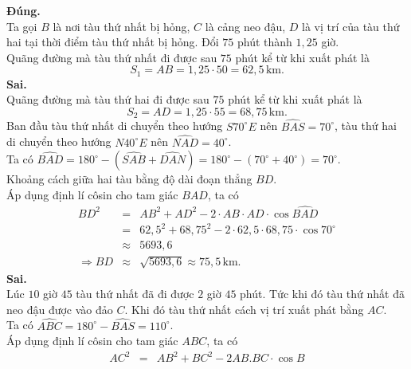 \begin{ex}
{\begin{center}
		\end{center}
\begin{itemchoice}
\itemch \textbf{Đúng.}\\
Ta gọi $B$ là nơi tàu thứ nhất bị hỏng, $C$ là cảng neo đậu, $D$ là vị trí của tàu thứ hai tại thời điểm tàu thứ nhất bị hỏng. Đổi $75$ phút thành $1{,}25$ giờ.\\
Quãng đường mà tàu thứ nhất đi được sau $75$ phút kể từ khi xuất phát là $$S_1=AB=1{,}25\cdot50=62{,}5\,\text{km}.$$
\itemch \textbf{Sai.}\\
Quãng đường mà tàu thứ hai đi được sau $75$ phút kể từ khi xuất phát là $$ S_2=AD=1{,}25\cdot55=68{,}75\,\text{km}.$$
Ban đầu tàu thứ nhất di chuyển theo hướng $S70^\circ E$ nên $\widehat{BAS}=70^\circ$, tàu thứ hai di chuyển theo hướng $N40^\circ E$ nên $\widehat{NAD}=40^\circ$.\\
Ta có $\widehat{BAD}=180^\circ-\left(\widehat{SAB}+\widehat{DAN}\right)=180^\circ-(70^\circ+40^\circ)=70^\circ$.\\
Khoảng cách giữa hai tàu bằng độ dài đoạn thẳng $BD$.\\
Áp dụng định lí côsin cho tam giác $BAD$, ta có
\allowdisplaybreaks
			\begin{eqnarray*}
				BD^2&=&AB^2+AD^2-2\cdot AB\cdot AD\cdot \cos \widehat{BAD} \\ &=&62{,}5^2+68{,}75^2-2\cdot 62{,}5\cdot 68{,}75\cdot \cos 70^\circ \\
				&\approx& 5693{,}6\\
				\Rightarrow BD&\approx& \sqrt{5693{,}6} \approx 75{,}5\,\text{km}.
			\end{eqnarray*}
\itemch \textbf{Sai.}\\
Lúc $10$ giờ $45$ tàu thứ nhất đã đi được $2$ giờ $45$ phút. Tức khi đó tàu thứ nhất đã neo đậu được vào đảo $C$. Khi đó tàu thứ nhất cách vị trí xuất phát bằng $AC$.\\
Ta có $\widehat{ABC}=180^\circ-\widehat{BAS}=110^\circ$.\\
Áp dụng định lí côsin cho tam giác $ABC$, ta có
			\allowdisplaybreaks
			\begin{eqnarray*}
				AC^2&=&AB^2+BC^2-2AB.BC\cdot{\cos B}\\

\end{eqnarray*}
\end{itemchoice}}
\end{ex}
